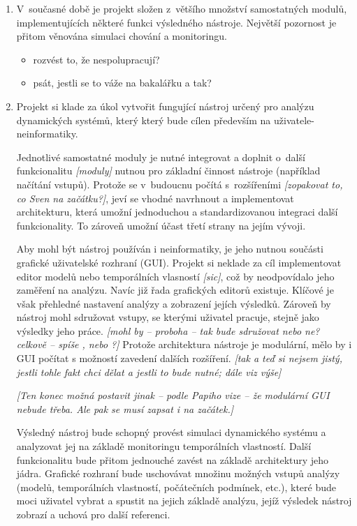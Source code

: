 \documentclass[a4paper]{article}
\begin{document}
\begin{enumerate}
\item V~současné době je projekt složen z~většího množství samostatných modulů, implementujících některé funkci výsledného nástroje. Největší pozornost
	je přitom věnována simulaci chování a monitoringu.

	\begin{itemize}\it
	\item rozvést to, že nespolupracují?
	\item psát, jestli se to váže na bakalářku a tak?
	\end{itemize}

\item Projekt si klade za úkol vytvořit fungující nástroj určený pro analýzu dynamických systémů, který který bude cílen především na uživatele-neinformatiky.

	Jednotlivé samostatné moduly je nutné integrovat a doplnit o~další funkcionalitu \emph{[moduly]} nutnou pro základní činnost nástroje (například načítání
	vstupů). Protože se v~budoucnu počítá s~rozšířeními \emph{[zopakovat to, co Sven na začátku?]}, jeví se vhodné navrhnout a implementovat architekturu, která umožní
	jednoduchou a standardizovanou integraci další funkcionality. To zároveň umožní účast třetí strany na jejím vývoji.

	Aby mohl být nástroj používán i neinformatiky, je jeho nutnou součásti grafické uživatelské rozhraní (GUI). Projekt si neklade za cíl implementovat editor modelů
	nebo temporálních 	vlasností \emph{[sic]}, což by neodpovídalo jeho zaměření na analýzu. Navíc již řada grafických editorů existuje. Klíčové je však přehledné
	nastavení analýzy a zobrazení jejích výsledků. Zároveň by nástroj mohl sdružovat vstupy, se kterými uživatel pracuje, stejně jako výsledky jeho práce.
	\emph{[mohl by -- proboha -- tak bude sdružovat nebo ne? celkově -- spíše , nebo ?]} Protože architektura nástroje je modulární,
	mělo by i GUI počítat s možností zavedení dalších rozšíření. \emph{[tak a teď si nejsem jistý, jestli tohle fakt chci dělat a jestli to bude nutné; dále viz výše]}

	\emph{[Ten konec možná postavit jinak -- podle Papiho vize -- že modulární GUI nebude třeba. Ale pak se musí zapsat i na začátek.]}

	Výsledný nástroj bude schopný provést simulaci dynamického systému a analyzovat jej na základě monitoringu temporálních vlastností. Další funkcionalitu bude přitom
	jednouché zavést na základě architektury jeho jádra. Grafické rozhraní bude uschovávat množinu možných vstupů analýzy (modelů, temporálních vlastností, počátečních podmínek, etc.),
	které bude moci uživatel vybrat a spustit na jejich základě analýzu, jejíž výsledek nástroj zobrazí a uchová pro další referenci.


\end{enumerate}
\end{document}
